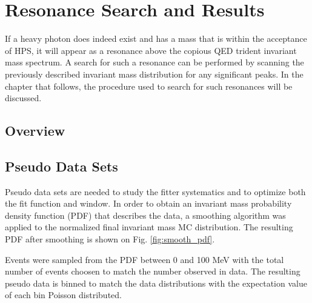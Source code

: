 
\chapter{Resonance Search and Results}

    If a heavy photon does indeed exist and has a mass that is within the 
    acceptance of HPS, it will appear as a resonance above the copious QED 
    trident invariant mass spectrum.  A search for such a resonance can be 
    performed by scanning the previously described invariant mass distribution
    for any significant peaks.  In the chapter that follows, the procedure used
    to search for such resonances will be discussed.


\section{Overview}



\section{Pseudo Data Sets}

Pseudo data sets are needed to study the fitter systematics and to optimize both
the fit function and window.  In order to obtain an invariant mass probability
density function (PDF) that describes the data, a smoothing algorithm was
applied to the normalized final invariant mass MC distribution.  The resulting
PDF after smoothing is shown on Fig. \ref{fig:smooth_pdf}. 

Events were sampled from the PDF between 0 and 100 MeV with the total number of
events choosen to match the number observed in data.  The resulting pseudo data
is binned to match the data distributions with the expectation value of each 
bin Poisson distributed. 
